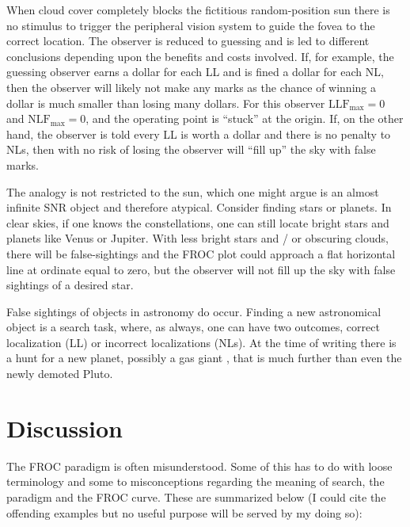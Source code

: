 \documentclass[
]{book}
\begin{document}
When cloud cover completely blocks the fictitious random-position sun there is no stimulus to trigger the peripheral vision system to guide the fovea to the correct location. The observer is reduced to guessing and is led to different conclusions depending upon the benefits and costs involved. If, for example, the guessing observer earns a dollar for each LL and is fined a dollar for each NL, then the observer will likely not make any marks as the chance of winning a dollar is much smaller than losing many dollars. For this observer \(\text{LLF}_{\text{max}} = 0\) and \(\text{NLF}_{\text{max}} = 0\), and the operating point is ``stuck'' at the origin. If, on the other hand, the observer is told every LL is worth a dollar and there is no penalty to NLs, then with no risk of losing the observer will ``fill up'' the sky with false marks.

The analogy is not restricted to the sun, which one might argue is an almost infinite SNR object and therefore atypical. Consider finding stars or planets. In clear skies, if one knows the constellations, one can still locate bright stars and planets like Venus or Jupiter. With less bright stars and / or obscuring clouds, there will be false-sightings and the FROC plot could approach a flat horizontal line at ordinate equal to zero, but the observer will not fill up the sky with false sightings of a desired star.

False sightings of objects in astronomy do occur. Finding a new astronomical object is a search task, where, as always, one can have two outcomes, correct localization (LL) or incorrect localizations (NLs). At the time of writing there is a hunt for a new planet, possibly a gas giant , that is much further than even the newly demoted Pluto.

\hypertarget{froc-paradigm-discussion}{%
\section{Discussion}\label{froc-paradigm-discussion}}

The FROC paradigm is often misunderstood. Some of this has to do with loose terminology and some to misconceptions regarding the meaning of search, the paradigm and the FROC curve. These are summarized below (I could cite the offending examples but no useful purpose will be served by my doing so):
\end{document}
